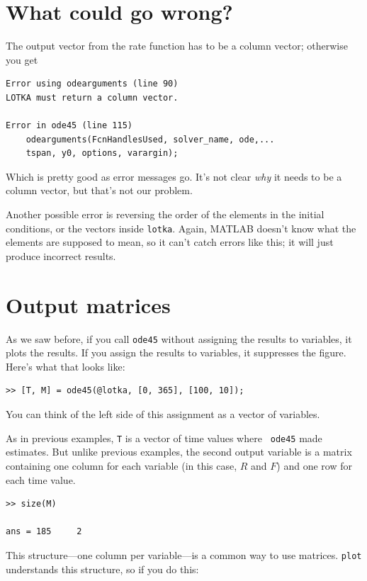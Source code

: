 \documentclass[
]{book}
\begin{document}
\section{What could go wrong?}

The output vector from the rate function
has to be a column vector; otherwise you get

\begin{verbatim}
Error using odearguments (line 90)
LOTKA must return a column vector.

Error in ode45 (line 115)
    odearguments(FcnHandlesUsed, solver_name, ode,...
    tspan, y0, options, varargin);
\end{verbatim}

Which is pretty good as error messages go.  It's not clear {\em why}
it needs to be a column vector, but that's not our problem.

Another possible error is reversing the order of the elements in the
initial conditions, or the vectors inside {\tt lotka}.  Again, MATLAB
doesn't know what the elements are supposed to mean, so it can't catch
errors like this; it will just produce incorrect results.


\section{Output matrices}

As we saw before, if you call {\tt ode45} without assigning the
results to variables, it plots the results.
If you assign
the results to variables, it suppresses the figure.
Here's what that looks like:

\begin{verbatim}
>> [T, M] = ode45(@lotka, [0, 365], [100, 10]);
\end{verbatim}

You can think of the left side of this assignment as a vector
of variables.

As in previous examples, {\tt T} is a vector of time values where {\tt
ode45} made estimates.  But unlike previous examples, the
second output variable is a matrix containing one column for each
variable (in this case, $R$ and $F$) and one row for each time value.

\begin{verbatim}
>> size(M)

ans = 185     2
\end{verbatim}

This structure---one column per variable---is a common way to
use matrices.  {\tt plot} understands this structure, so if you
do this:
\end{document}
